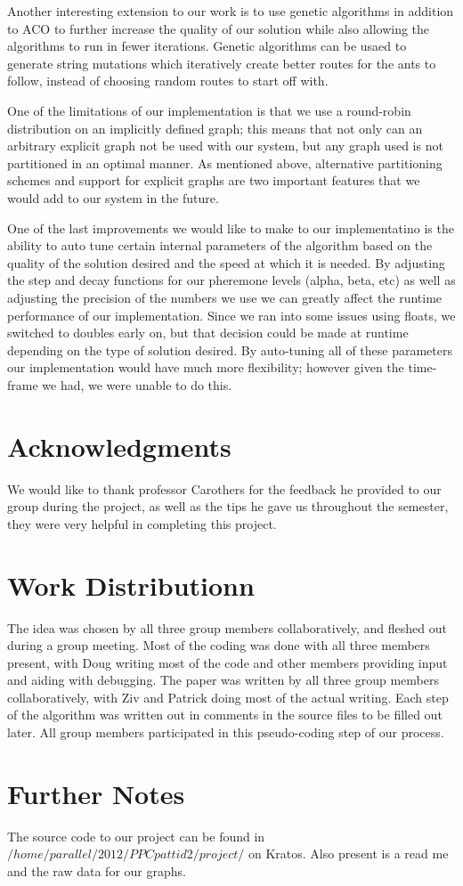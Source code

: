 \documentclass{acm_proc_article-sp}
\begin{document}
Another interesting extension to our work is to use genetic algorithms in addition to ACO to further 
increase the quality of our solution while also allowing the algorithms to run in fewer iterations. Genetic
algorithms can be usaed to generate string mutations which iteratively create better routes for the ants to follow,
instead of choosing random routes to start off with.

One of the limitations of our implementation is that we use a round-robin distribution on an implicitly defined graph; 
this means that not only can an arbitrary explicit graph not be used with our system, but any graph used is not partitioned
in an optimal manner. As mentioned above, alternative partitioning schemes and support for explicit graphs are two important features that we would add to our system in the future.

One of the last improvements we would like to make to our implementatino is the ability to auto tune certain internal parameters
of the algorithm based on the quality of the solution desired and the speed at which it is needed. By adjusting the step and decay functions for our pheremone levels (alpha, beta, etc) as well as adjusting the precision of the numbers we use we can greatly affect the runtime performance of our implementation. Since we ran into some issues using floats, we switched to doubles early on, but that decision could be made at runtime depending on the type of solution desired. By auto-tuning all of these parameters our implementation would have much more flexibility; however given the time-frame we had, we were unable to do this.

\section{Acknowledgments}
We would like to thank professor Carothers for the feedback he provided to 
our group during the project, as well as the tips he gave us throughout the
semester, they were very helpful in completing this project.

\section{Work Distributionn}
The idea was chosen by all three group members collaboratively, and fleshed out 
during a group meeting. Most of the coding was done with all three members present,
with Doug writing most of the code and other members providing input and aiding with
debugging. The paper was written by all three group members collaboratively, with Ziv
and Patrick doing most of the actual writing. Each step of the algorithm was written out
in comments in the source files to be filled out later. All group members participated in this
pseudo-coding step of our process. 

\section{Further Notes}
The source code to our project can be found in \\
$/home/parallel/2012/PPCpattid2/project/$ on Kratos. Also present is a read me and the raw data for our graphs. 




\balancecolumns
\end{document}

